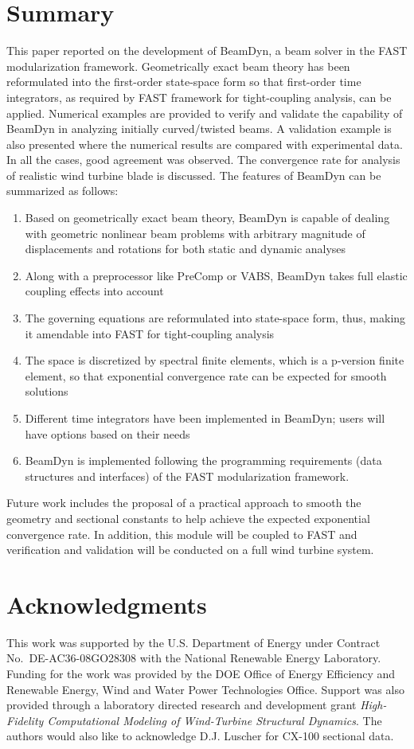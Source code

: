 \documentclass{aiaa-tc}
\begin{document}
 \section{Summary}
  This paper reported on the development of BeamDyn, a beam solver in the FAST modularization framework. Geometrically exact beam theory has been reformulated into the first-order state-space form so that first-order time integrators, as required by FAST framework for tight-coupling analysis, can be applied. Numerical examples are provided to verify and validate the capability of BeamDyn in analyzing initially curved/twisted beams. A validation example is also presented where the numerical results are compared with experimental data. In all the cases, good agreement was observed.  The convergence rate for analysis of realistic wind turbine blade is discussed. The features of BeamDyn can be summarized as follows:
  \begin{enumerate}
  \item Based on geometrically exact beam theory, BeamDyn is capable of dealing with geometric nonlinear beam problems with arbitrary magnitude of displacements and rotations for both static and dynamic analyses
  \item Along with a preprocessor like PreComp or VABS, BeamDyn takes full elastic coupling effects into account
  \item The governing equations are reformulated into state-space form, thus, making it amendable into FAST for tight-coupling analysis
  \item The space is discretized by spectral finite elements, which is a p-version finite element, so that exponential convergence rate can be expected for smooth solutions
  \item Different time integrators have been implemented in BeamDyn; users will have options based on their needs
  \item BeamDyn is implemented following the programming requirements (data structures and interfaces) of the FAST modularization framework.
  \end{enumerate}
   Future work includes the proposal of a practical approach to smooth the geometry and sectional constants to help achieve the expected exponential convergence rate. In addition, this module will be coupled to FAST and verification and validation will be conducted on a full wind turbine system. 
  
\section*{Acknowledgments} 

This work was supported by the U.S. Department of Energy under Contract No.\
DE-AC36-08GO28308 with the National Renewable Energy Laboratory. Funding for the work was provided by the DOE Office of Energy Efficiency and Renewable Energy, Wind and Water Power Technologies Office. Support
was also provided through a laboratory directed research and development grant
\textit{High-Fidelity Computational Modeling of Wind-Turbine Structural
Dynamics}. The authors would also like to acknowledge D.J. Luscher for CX-100 sectional data.
  
  



\end{document}
